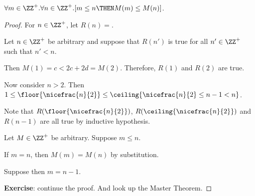 \documentclass[11pt]{scrartcl}
\begin{document}
\begin{lemma}
  $\forall m\in\ZZ^+. \forall n\in\ZZ^+.[m\leq n \THEN M(m) \leq M(n)]$.
\end{lemma}
\begin{proof}
  \hfill

  For $n\in\ZZ^+$, let $R(n) =$.
  
  Let $n\in\ZZ^{+}$ be arbitrary and suppose that $R(n')$ is true for all $n'\in\ZZ^{+}$ such that $n' < n$.

  Then $M(1) = c < 2c +2d = M(2) $. Therefore, $R(1)$ and $R(2)$ are true.

  Now consider $n> 2$. Then $1\leq \floor{\nicefrac{n}{2}} \leq \ceiling{\nicefrac{n}{2}\leq n-1 < n}$.

  Note that $R(\floor{\nicefrac{n}{2}})$, $R(\ceiling{\nicefrac{n}{2}})$
  and $R(n-1)$ are all true by inductive hypothesis.

  Let $M\in\ZZ^{+}$ be arbitrary. Suppose $m \leq n$.

  If $m = n$, then $M(m) = M(n)$ by substitution.

  Suppose then $m = n-1$.

  \textbf{Exercise}: continue the proof. And look up the Master Theorem.
\end{proof}
\end{document}
